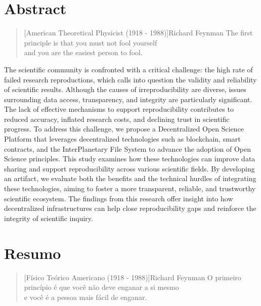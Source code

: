 \documentclass[final]{rc-book-2.14}
\begin{document}
\chapter{Abstract}
\label{chp:general-abstract:english}


\begin{quotation}[American Theoretical Physicist (1918 - 1988)]{Richard Feynman}
    The first principle is that you must not fool yourself \\ and you are the easiest person to fool.
\end{quotation}

\drop  The scientific community is confronted with a critical challenge: the high rate of failed research reproductions, which calls into question the validity and reliability of scientific results. Although the causes of irreproducibility are diverse, issues surrounding data access, transparency, and integrity are particularly significant. The lack of effective mechanisms to support reproducibility contributes to reduced accuracy, inflated research costs, and declining trust in scientific progress. To address this challenge, we propose a Decentralized Open Science Platform that leverages decentralized technologies such as blockchain, smart contracts, and the InterPlanetary File System to advance the adoption of Open Science principles. This study examines how these technologies can improve data sharing and support reproducibility across various scientific fields. By developing an artifact, we evaluate both the benefits and the technical hurdles of integrating these technologies, aiming to foster a more transparent, reliable, and trustworthy scientific ecosystem. The findings from this research offer insight into how decentralized infrastructures can help close reproducibility gaps and reinforce the integrity of scientific inquiry.


\chapter{Resumo}
\label{chp:general-abstract:portuguese}

\begin{quotation}[Físico Teórico Americano (1918 - 1988)]{Richard Feynman}
    O primeiro princípio é que você não deve enganar a si mesmo \\ e você é a pessoa mais fácil de enganar.
\end{quotation}
\end{document}
